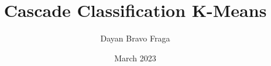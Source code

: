 \documentclass[24pt]{article}
\begin{document}
    \title{Cascade Classification K-Means}
    \date{March 2023}
    \author{Dayan Bravo Fraga}
    \maketitle
    
    
    
\end{document}
